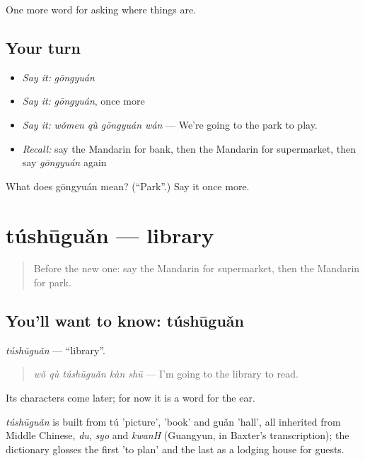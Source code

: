 \begin{grammarlens}[title={What you've built}]
One more word for asking where things are.
\end{grammarlens}

\subsection*{Your turn}
\begin{itemize}
\raggedright
  \item \emph{Say it:} \emph{gōngyuán}
  \item \emph{Say it:} \emph{gōngyuán}, once more
  \item \emph{Say it:} \emph{wǒmen qù gōngyuán wán} — We're going to the park to play.
  \item \emph{Recall:} say the Mandarin for bank, then the Mandarin for supermarket, then say \emph{gōngyuán} again
\end{itemize}

\begin{tcolorbox}[breakable,colback=teal!4,colframe=teal!35!black,title={Before you move on}]
What does gōngyuán mean? (\textquotedblleft{}Park\textquotedblright{}.) Say it once more.
\end{tcolorbox}
\section[túshūguǎn]{túshūguǎn — library}

\label{lesson:ZH-C100-tushuguan}



\begin{quote}
Before the new one: say the Mandarin for supermarket, then the Mandarin for park.
\end{quote}

\subsection*{You'll want to know: túshūguǎn}
\emph{túshūguǎn} — \textquotedblleft{}library\textquotedblright{}.

\begin{quote}
\emph{wǒ qù túshūguǎn kàn shū} — I'm going to the library to read.
\end{quote}

Its characters come later; for now it is a word for the ear.

\begin{cousinweb}
\emph{túshūguǎn} is built from tú 'picture',  'book' and guǎn 'hall', all inherited from Middle Chinese, \emph{du}, \emph{syo} and \emph{kwanH} (Guangyun, in Baxter's transcription); the dictionary glosses the first 'to plan' and the last as a lodging house for guests.
\end{cousinweb}

